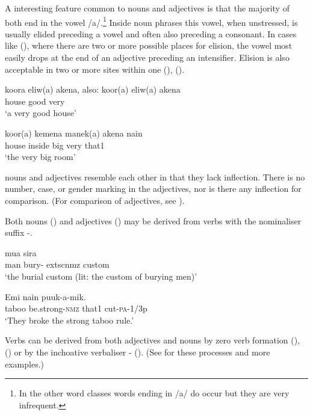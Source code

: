 A  interesting feature common to nouns and adjectives is that the majority of both end in the vowel /a/.\footnote{In the other word classes words ending in /a/ do occur but they are very infrequent.} Inside noun phrases this vowel, when unstressed, is usually elided preceding a vowel and often also preceding a consonant. In cases like (), where there are two or more possible places for elision, the vowel most easily drops at the end of an adjective preceding an intensifier. Elision is also acceptable in two or more sites within one  (), (). 

\ea%
\label{ex:x3}
\gll koora eliw(a) akena, also: koor(a) eliw(a) akena \\
house good very\\
\glt`a very good house'
\z

\ea%
\label{ex:x4}
\gll koor(a) kemena manek(a) akena nain \\
house inside big very that1\\
\glt`the very big room'
\z

 nouns and adjectives resemble each other in that they lack inflection. There is no number, case, or gender marking in the adjectives, nor is there any inflection for comparison. (For comparison of adjectives, see ). 

Both nouns () and adjectives () may be derived from verbs with the nominaliser suffix \nobreakdash-.

\ea%
\label{ex:x7}
\gll mua  sira \\
man bury-	extsc{nmz} custom\\
\glt`the burial custom (lit: the custom of burying men)'
\z

\ea%
\label{ex:x8}
\gll Emi  nain puuk-a-mik. \\
taboo be.strong-\textsc{nmz} that1 cut-\textsc{pa}-1/3p\\
\glt`They broke the strong taboo rule.'
\z

Verbs can be derived from both adjectives and nouns by zero verb formation (), () or by the inchoative verbaliser \nobreakdash- (). (See  for these processes and more examples.)

